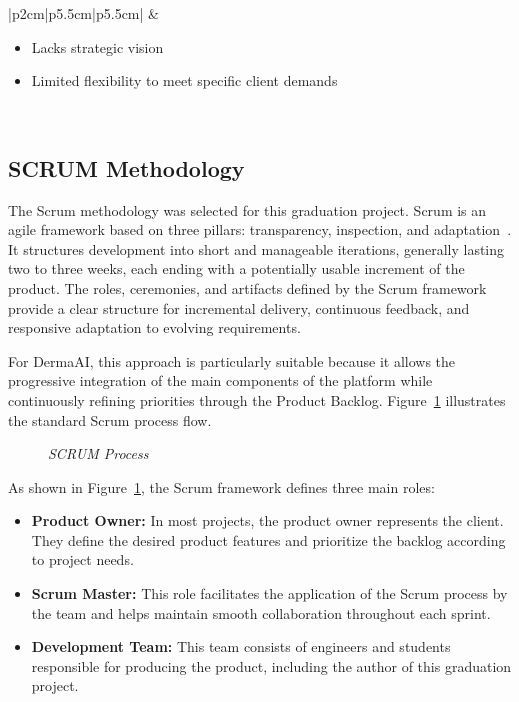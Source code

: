 \begin{table}[H]
\begin{tabular}{|p{2cm}|p{5.5cm}|p{5.5cm}|}
	  &
	  \begin{minipage}[t]{\linewidth}
	    \begin{itemize}[noitemsep, topsep=2pt, leftmargin=1em]
	      \item[-] Lacks strategic vision
	      \item[-] Limited flexibility to meet specific client demands
	    \end{itemize}
	  \end{minipage}
	  \\[30pt]
	\hline
	\end{tabular}
	\caption{\textit{Comparative Table of Agile Methods}}
	\label{tab:agile}
	
	\end{table}
	\subsection{SCRUM Methodology}
	
	The Scrum methodology was selected for this graduation project. Scrum is an agile framework based on three pillars: transparency, inspection, and adaptation~\cite{Schwaber2020}. It structures development into short and manageable iterations, generally lasting two to three weeks, each ending with a potentially usable increment of the product. The roles, ceremonies, and artifacts defined by the Scrum framework provide a clear structure for incremental delivery, continuous feedback, and responsive adaptation to evolving requirements.
	
	For DermaAI, this approach is particularly suitable because it allows the progressive integration of the main components of the platform while continuously refining priorities through the Product Backlog. Figure~\ref{fig:scrum} illustrates the standard Scrum process flow.
	
	\begin{figure}[H]
	  \centering
	  \caption{\textit{SCRUM Process~\cite{Schwaber2020}}}
	  \label{fig:scrum}
	\end{figure}
	
	As shown in Figure~\ref{fig:scrum}, the Scrum framework defines three main roles:
	
	\begin{itemize}
	  \item \textbf{Product Owner:} In most projects, the product owner represents the client.
	        They define the desired product features and prioritize the backlog according to
	        project needs.
	
	  \item \textbf{Scrum Master:} This role facilitates the application of the Scrum process
	        by the team and helps maintain smooth collaboration throughout each sprint.
	
	  \item \textbf{Development Team:} This team consists of engineers and students
	        responsible for producing the product, including the author of this graduation project.
	\end{itemize}
	
